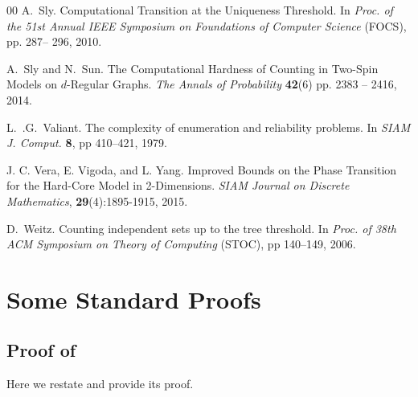 \documentclass[11pt,reqno]{amsart}
\numberwithin{equation}{section}
\newcommand{\blue}[1]{{\color{blue}#1}}
\newcommand{\spreadpoint}{\newpage}
\renewcommand{\spreadpoint}{}
\renewcommand{\blue}[1]{#1}
\begin{document}
\begin{thebibliography}{00}
A.~Sly. Computational Transition at the Uniqueness Threshold. In {\em Proc. of the 51st Annual IEEE Symposium on Foundations 
of Computer Science} (FOCS), pp. 287– 296, 2010.



A.~Sly and N.~Sun. The Computational Hardness of Counting in Two-Spin Models on $d$-Regular Graphs. 
{\em The Annals of Probability} {\bf 42}(6) pp. 2383 -- 2416, 2014.


%

L.~.G.~Valiant. The complexity of enumeration and reliability problems. 
In {\em SIAM J. Comput.} {\bf 8}, pp 410--421, 1979.



J. C. Vera, E. Vigoda, and L. Yang. Improved Bounds on the Phase Transition for the Hard-Core Model in 2-Dimensions. 
{\em SIAM Journal on Discrete Mathematics}, {\bf 29}(4):1895-1915, 2015. 


D.~Weitz. Counting independent sets up to the tree threshold.
In {\em Proc. of 38th {ACM} Symposium on Theory of Computing}
(STOC), pp 140--149, 2006.

\end{thebibliography}

 
 
 
\spreadpoint
\newpage
\appendix

\section{Some Standard Proofs}




\subsection{Proof of }\label{sec:claim:InfSymmetrisation}


 


Here we restate  and provide its proof.
\end{document}
